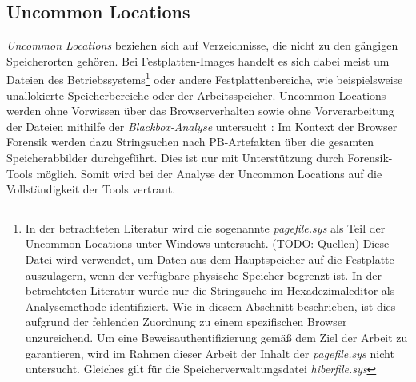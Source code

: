\subsection{Uncommon Locations}
\label{subsection:methodik-datenanalyse-uncommonlocations}
\textit{Uncommon Locations} beziehen sich auf Verzeichnisse, die nicht zu den gängigen Speicherorten gehören. 
Bei Festplatten-Images handelt es sich dabei meist um Dateien des Betriebssystems\footnote{
In der betrachteten Literatur wird die sogenannte \textit{pagefile.sys} als Teil der Uncommon Locations unter Windows untersucht. (TODO: Quellen) Diese Datei wird verwendet, um Daten aus dem Hauptspeicher auf die Festplatte auszulagern, wenn der verfügbare physische Speicher begrenzt ist. \cite{MicrosoftLearn.21.03.2023}
In der betrachteten Literatur wurde nur die Stringsuche im Hexadezimaleditor als Analysemethode identifiziert. Wie in diesem Abschnitt beschrieben, ist dies aufgrund der fehlenden Zuordnung zu einem spezifischen Browser unzureichend. Um eine Beweisauthentifizierung gemäß dem Ziel der Arbeit zu garantieren, wird im Rahmen dieser Arbeit der Inhalt der \textit{pagefile.sys} nicht untersucht. Gleiches gilt für die Speicherverwaltungsdatei \textit{hiberfile.sys}
} oder andere Festplattenbereiche, wie beispielsweise unallokierte Speicherbereiche oder der Arbeitsspeicher.
Uncommon Locations werden ohne Vorwissen über das Browserverhalten sowie ohne Vorverarbeitung der Dateien mithilfe der \textit{Blackbox-Analyse} untersucht \cite{Bonetti.2014}:
Im Kontext der Browser Forensik werden dazu Stringsuchen nach PB-Artefakten über die gesamten Speicherabbilder durchgeführt.
Dies ist nur mit Unterstützung durch Forensik-Tools möglich. Somit wird bei der Analyse der Uncommon Locations auf die Vollständigkeit der Tools vertraut.

